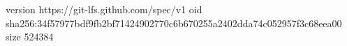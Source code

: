 version https://git-lfs.github.com/spec/v1
oid sha256:34f57977bdf9fb2bf71424902770c6b670255a2402dda74c052957f3c68eea00
size 524384
